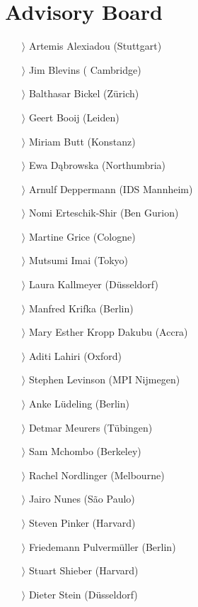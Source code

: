 \documentclass[
notumble,
nofoldmark,
]{leaflet}
\begin{document}
  
    
 

\newpage 
\color{LIGHTGRAY}
\section{ \sffamily \Large Advisory Board}

\begin{itemize}
 \item[$\rangle$] Artemis Alexiadou (Stuttgart)
 \item[$\rangle$] Jim Blevins ( Cambridge)
 \item[$\rangle$] Balthasar Bickel (Z\"urich)
 \item[$\rangle$] Geert Booij (Leiden)
 \item[$\rangle$] Miriam Butt (Konstanz)
 \item[$\rangle$] Ewa D\k{a}browska (Northumbria)
 \item[$\rangle$] Arnulf Deppermann (IDS Mannheim)
 \item[$\rangle$] Nomi Erteschik-Shir (Ben Gurion)
 \item[$\rangle$] Martine Grice (Cologne)
 \item[$\rangle$] Mutsumi Imai (Tokyo)
 \item[$\rangle$] Laura Kallmeyer (D\"usseldorf)
 \item[$\rangle$] Manfred Krifka (Berlin)
 \item[$\rangle$] Mary Esther Kropp Dakubu (Accra)
 \item[$\rangle$] Aditi Lahiri (Oxford)
 \item[$\rangle$] Stephen Levinson (MPI Nijmegen)
 \item[$\rangle$] Anke L\"udeling (Berlin)
 \item[$\rangle$] Detmar Meurers (T\"ubingen)
 \item[$\rangle$] Sam Mchombo (Berkeley)
 \item[$\rangle$] Rachel Nordlinger (Melbourne)
 \item[$\rangle$] Jairo Nunes (S\~ao Paulo)
 \item[$\rangle$] Steven Pinker (Harvard)
 \item[$\rangle$] Friedemann Pulverm\"uller (Berlin)
 \item[$\rangle$] Stuart Shieber (Harvard)
 \item[$\rangle$] Dieter Stein (D\"usseldorf)  
\end{itemize}
\end{document}
